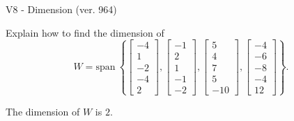 \begin{exercise}
  \begin{exerciseTitle}V8 - Dimension (ver. 964)\end{exerciseTitle}
  \begin{exerciseStatement}
    Explain how to find the dimension of 
\[W=\mathrm{span}\ \left\{\left[\begin{array}{r}
-4 \\
1 \\
-2 \\
-4 \\
2
\end{array}\right] , \left[\begin{array}{r}
-1 \\
2 \\
1 \\
-1 \\
-2
\end{array}\right] , \left[\begin{array}{r}
5 \\
4 \\
7 \\
5 \\
-10
\end{array}\right] , \left[\begin{array}{r}
-4 \\
-6 \\
-8 \\
-4 \\
12
\end{array}\right]\right\}.\]



  \end{exerciseStatement}
  \begin{exerciseAnswer}
   The dimension of \(W\) is  \(2\).
  


  \end{exerciseAnswer}
\end{exercise}